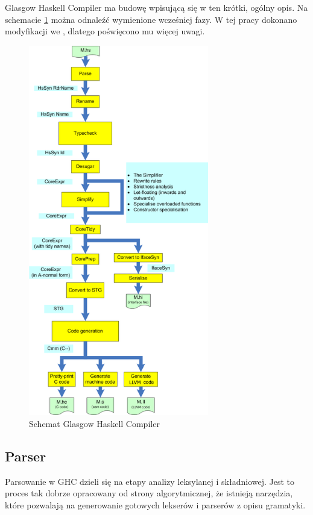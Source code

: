 Glasgow Haskell Compiler ma budowę wpisującą się w ten krótki, ogólny opis. Na schemacie \ref{fig:AOSA_compiler} można odnaleźć wymienione wcześniej fazy. W tej pracy dokonano modyfikacji we , dlatego poświęcono mu więcej uwagi.

\begin{figure}[ht]
    \centering
    \includegraphics[width=0.7\textwidth]{images/AOSA_compiler}
    \caption[Schemat Glasgow Haskell Compiler]{Schemat Glasgow Haskell Compiler\cite{AOSA}}
    \label{fig:AOSA_compiler}
\end{figure}

\subsection{Parser}\label{sec:parser}
Parsowanie w GHC dzieli się na etapy analizy leksylanej i składniowej. Jest to proces tak dobrze opracowany od strony algorytmicznej, że istnieją narzędzia, które pozwalają na generowanie gotowych lekserów i parserów z opisu gramatyki.

